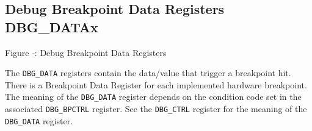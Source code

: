 \subsection{Debug Breakpoint Data Registers
DBG\_DATAx}\label{debug-breakpoint-data-registers-dbg_datax}

\missingfigure{}

Figure ‑: Debug Breakpoint Data Registers

The \texttt{DBG\_DATA} registers contain the data/value that trigger a breakpoint
hit. There is a Breakpoint Data Register for each implemented hardware
breakpoint. The meaning of the \texttt{DBG\_DATA} register depends on the
condition code set in the associated \texttt{DBG\_BPCTRL} register. See the
\texttt{DBG\_CTRL} register for the meaning of the \texttt{DBG\_DATA} register.